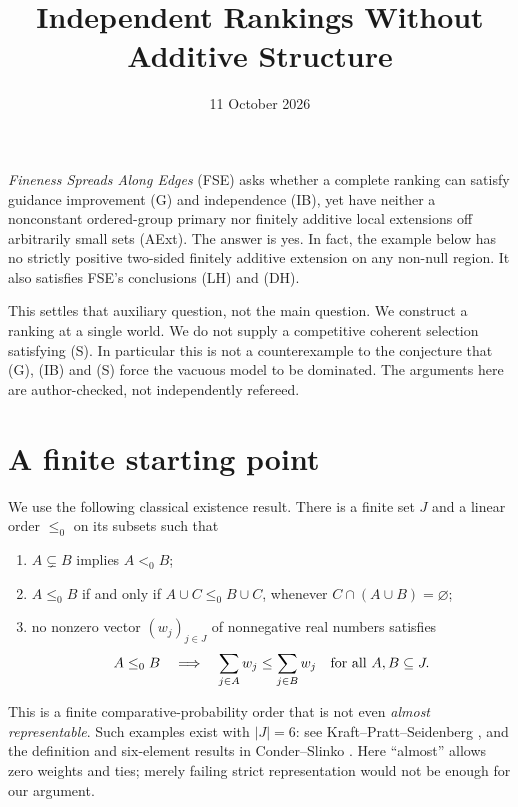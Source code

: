 \documentclass[11pt]{article}
\title{Independent Rankings Without Additive Structure}
\author{}\date{11 October 2026}
\theoremstyle{remark}\newtheorem{remark}[theorem]{Remark}
\begin{document}
\maketitle

\noindent
\emph{Fineness Spreads Along Edges} (FSE) asks whether a complete ranking
can satisfy guidance improvement (G) and independence (IB), yet have
neither a nonconstant ordered-group primary nor finitely additive local
extensions off arbitrarily small sets (AExt). The answer is yes. In fact,
the example below has no strictly positive two-sided finitely additive
extension on any non-null region. It also satisfies FSE's conclusions
(LH) and (DH).

This settles that auxiliary question, not the main question. We construct
a ranking at a single world. We do not supply a competitive coherent
selection satisfying (S). In particular this is not a counterexample to
the conjecture that (G), (IB) and (S) force the vacuous model to be
dominated. The arguments here are author-checked, not independently
refereed.

\section{A finite starting point}

We use the following classical existence result. There is a finite set
$J$ and a linear order $\le_0$ on its subsets such that
\begin{enumerate}[label=(\roman*),leftmargin=*]
\item $A\subsetneq B$ implies $A<_0B$;
\item $A\le_0B$ if and only if $A\cup C\le_0B\cup C$, whenever
$C\cap(A\cup B)=\varnothing$;
\item no nonzero vector $(w_j)_{j\in J}$ of nonnegative real numbers
satisfies
\begin{equation}
 A\le_0B\quad\Longrightarrow\quad
 \sum_{j\in A}w_j\le\sum_{j\in B}w_j
 \quad\hbox{for all }A,B\subseteq J.                 \label{eq:noalmost}
\end{equation}
\end{enumerate}
This is a finite comparative-probability order that is not even
\emph{almost representable}. Such examples exist with $|J|=6$: see
Kraft--Pratt--Seidenberg \cite{KPS}, and the definition and six-element
results in Conder--Slinko \cite[Sections 2 and 5]{CS}. Here ``almost''
allows zero weights and ties; merely failing strict representation
would not be enough for our argument.
\end{document}
